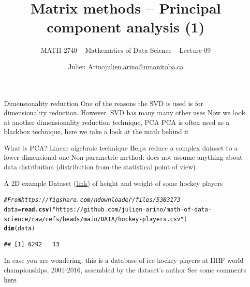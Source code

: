 \documentclass[aspectratio=169]{beamer}\usepackage[]{graphicx}\usepackage[]{xcolor}
\subtitle{MATH 2740 -- Mathematics of Data Science -- Lecture 09}
\author{\texorpdfstring{Julien Arino\newline\url{julien.arino@umanitoba.ca}}{Julien Arino}}
\institute{Department of Mathematics @ University of Manitoba}
\title{Matrix methods -- Principal component analysis (1)}
\makeatletter
\newcommand{\hlsng}[1]{\textcolor[rgb]{0.192,0.494,0.8}{#1}}%
\newcommand{\hlcom}[1]{\textcolor[rgb]{0.678,0.584,0.686}{\textit{#1}}}%
\newcommand{\hldef}[1]{\textcolor[rgb]{0.345,0.345,0.345}{#1}}%
\newcommand{\hlkwb}[1]{\textcolor[rgb]{0.69,0.353,0.396}{#1}}%
\newcommand{\hlkwd}[1]{\textcolor[rgb]{0.737,0.353,0.396}{\textbf{#1}}}%
\newenvironment{kframe}{%
 \def\at@end@of@kframe{}%
 \ifinner\ifhmode%
  \def\at@end@of@kframe{\end{minipage}}%
  \begin{minipage}{\columnwidth}%
 \fi\fi%
 \def\FrameCommand##1{\hskip\@totalleftmargin \hskip-\fboxsep
 \colorbox{shadecolor}{##1}\hskip-\fboxsep
     \hskip-\linewidth \hskip-\@totalleftmargin \hskip\columnwidth}%
 \MakeFramed {\advance\hsize-\width
   \@totalleftmargin\z@ \linewidth\hsize
   \@setminipage}}%
 {\par\unskip\endMakeFramed%
 \at@end@of@kframe}
\newenvironment{knitrout}{}{} %
\makeatother
\begin{document}
\setcounter{theorem}{79}




\begin{frame}{Dimensionality reduction}
One of the reasons the SVD is used is for dimensionality reduction. However, SVD has many many other uses
\vfill
Now we look at another dimensionality reduction technique, PCA
\vfill
PCA is often used as a blackbox technique, here we take a look at the math behind it
\end{frame}


\begin{frame}{What is PCA?}
Linear algebraic technique 
\vfill
Helps reduce a complex dataset to a lower dimensional one
\vfill
Non-parametric method: does not assume anything about data distribution (distribution from the statistical point of view)
\end{frame}


\begin{frame}[fragile]{A 2D example}
Dataset (\href{https://opendata.stackexchange.com/questions/7793/age-weight-and-height-dataset}{link}) of height and weight of some hockey players
\vfill
\begin{knitrout}
\color{fgcolor}\begin{kframe}
\begin{alltt}
\hlcom{# From https://figshare.com/ndownloader/files/5303173}
\hldef{data} \hlkwb{=} \hlkwd{read.csv}\hldef{(}\hlsng{"https://github.com/julien-arino/math-of-data-science/raw/refs/heads/main/DATA/hockey-players.csv"}\hldef{)}
\hlkwd{dim}\hldef{(data)}
\end{alltt}
\begin{verbatim}
## [1] 6292   13
\end{verbatim}
\end{kframe}
\end{knitrout}
\vfill
In case you are wondering, this is a database of ice hockey players at IIHF world championships, 2001-2016, assembled by the dataset's author
\vfill
See some comments \href{https://ikashnitsky.github.io/2017/ice-hockey-players-height/}{here}
\vfill

\end{frame}
\end{document}
